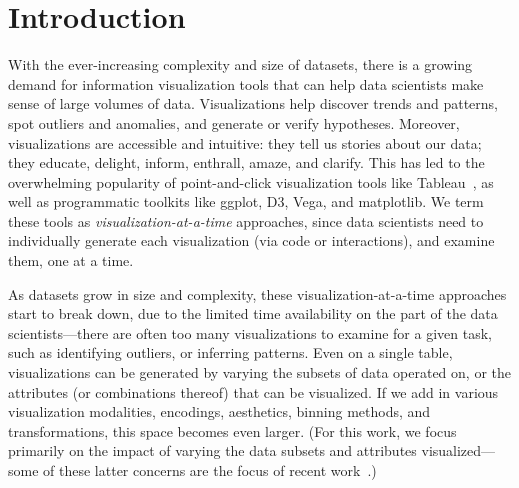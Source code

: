 \section{Introduction}%

\par 
With the ever-increasing complexity 
and size of datasets,
there is a growing demand for 
information visualization tools
that can help data scientists make sense of large
volumes of data.
Visualizations help discover 
trends and patterns, 
spot outliers and anomalies, 
and generate or verify hypotheses.
Moreover, 
visualizations are accessible and intuitive: 
they tell us stories about our data; 
they educate, delight, inform, 
enthrall, amaze, and clarify.
This has led to the overwhelming popularity
of point-and-click visualization tools like Tableau~\cite{Stolte2002},
as well as programmatic toolkits like ggplot, D3, Vega, and matplotlib. 
We term these tools as {\em visualization-at-a-time} approaches, since
data scientists need to individually 
generate each visualization (via code or interactions),
and examine them, 
one at a time.


\par
As datasets grow in size and complexity, 
these visualization-at-a-time approaches start to break down,
due to the limited time availability on the 
part of the data scientists---there 
are often too many visualizations to examine for a given 
task, such as identifying outliers, or inferring patterns. 
Even on a single table, 
visualizations can be generated
by varying the subsets of data operated on, 
or the attributes (or combinations
thereof) that can be visualized. 
If we add in various visualization modalities, encodings,
aesthetics, binning methods, and transformations,
this space becomes even larger. 
(For this work, we focus primarily on
the impact of varying the data subsets
and attributes visualized---some of these
latter concerns are the focus of recent work~\cite{Wongsuphasawat2017}.)

